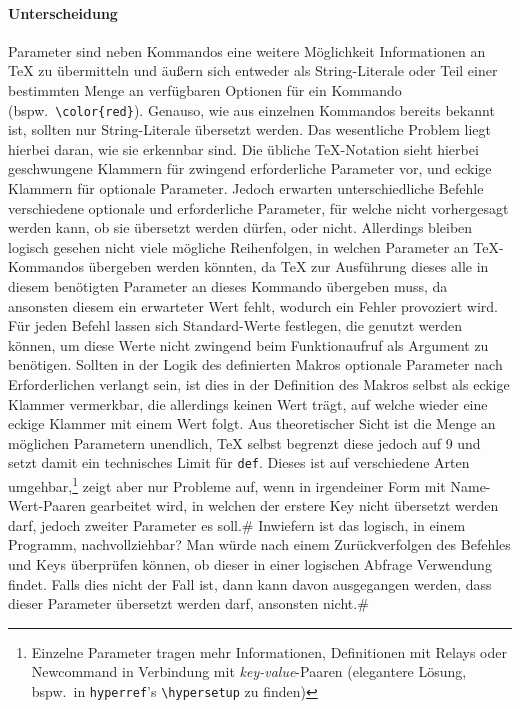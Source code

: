 \paragraph{Unterscheidung}\par
Parameter sind neben Kommandos eine weitere Möglichkeit Informationen an \TeX{} zu übermitteln und äußern sich entweder als String-Literale oder Teil einer bestimmten Menge an verfügbaren Optionen für ein Kommando (bspw.\ \verb|\color{red}|). Genauso, wie aus einzelnen Kommandos bereits bekannt ist, sollten nur String-Literale übersetzt werden. Das wesentliche Problem liegt hierbei daran, wie sie erkennbar sind. Die übliche \TeX{}-Notation sieht hierbei geschwungene Klammern für zwingend erforderliche Parameter vor, und eckige Klammern für optionale Parameter. Jedoch erwarten unterschiedliche Befehle verschiedene optionale und erforderliche Parameter, für welche nicht vorhergesagt werden kann, ob sie übersetzt werden dürfen, oder nicht. Allerdings bleiben logisch gesehen nicht viele mögliche Reihenfolgen, in welchen Parameter an \TeX{}-Kommandos übergeben werden könnten, da \TeX{} zur Ausführung dieses alle in diesem benötigten Parameter an dieses Kommando übergeben muss, da ansonsten diesem ein erwarteter Wert fehlt, wodurch ein Fehler provoziert wird. Für jeden Befehl lassen sich Standard-Werte festlegen, die genutzt werden können, um diese Werte nicht zwingend beim Funktionaufruf als Argument zu benötigen. Sollten in der Logik des definierten Makros optionale Parameter nach Erforderlichen verlangt sein, ist dies in der Definition des Makros selbst als eckige Klammer vermerkbar, die allerdings keinen Wert trägt, auf welche wieder eine eckige Klammer mit einem Wert folgt. 
Aus theoretischer Sicht ist die Menge an möglichen Parametern unendlich, \TeX{} selbst begrenzt diese jedoch auf 9 und setzt damit ein technisches Limit für \texttt{def}. Dieses ist auf verschiedene Arten umgehbar,\footnote{Einzelne Parameter tragen mehr Informationen, Definitionen mit Relays oder Newcommand in Verbindung mit \textit{key-value}-Paaren (elegantere Lösung, bspw.\ in \texttt{hyperref}'s \verb|\hypersetup| zu finden)} zeigt aber nur Probleme auf, wenn in irgendeiner Form mit Name-Wert-Paaren gearbeitet wird, in welchen der erstere Key nicht übersetzt werden darf, jedoch zweiter Parameter es soll.#%
Inwiefern ist das logisch, in einem Programm, nachvollziehbar? Man würde nach einem Zurückverfolgen des Befehles und Keys überprüfen können, ob dieser in einer logischen Abfrage Verwendung findet. Falls dies nicht der Fall ist, dann kann davon ausgegangen werden, dass dieser Parameter übersetzt werden darf, ansonsten nicht.#%


